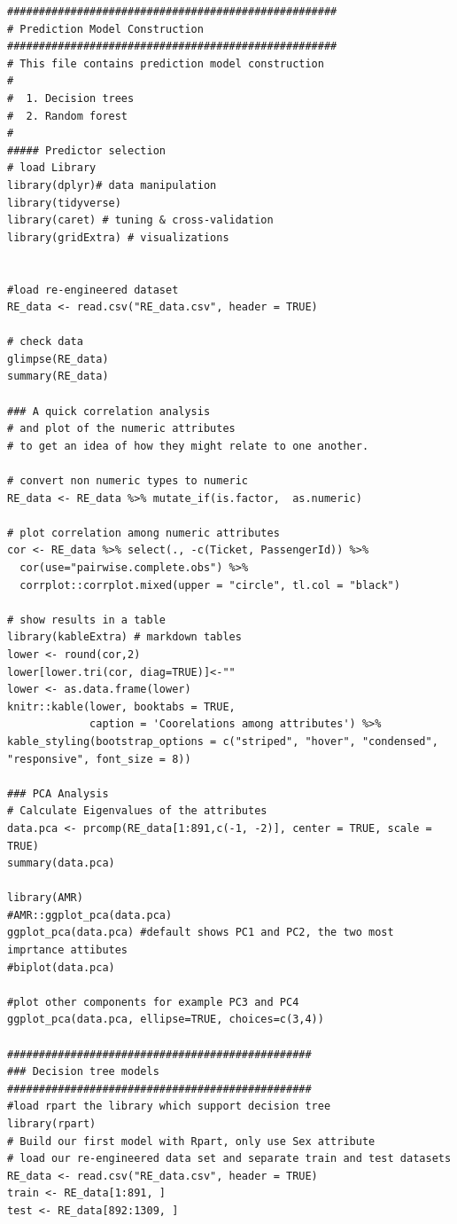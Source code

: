 \documentclass[
]{book}
\begin{document}
\begin{verbatim}
####################################################
# Prediction Model Construction
####################################################
# This file contains prediction model construction
#
#  1. Decision trees
#  2. Random forest
#
##### Predictor selection
# load Library
library(dplyr)# data manipulation
library(tidyverse)
library(caret) # tuning & cross-validation
library(gridExtra) # visualizations


#load re-engineered dataset
RE_data <- read.csv("RE_data.csv", header = TRUE)

# check data
glimpse(RE_data)
summary(RE_data)

### A quick correlation analysis
# and plot of the numeric attributes
# to get an idea of how they might relate to one another.

# convert non numeric types to numeric
RE_data <- RE_data %>% mutate_if(is.factor,  as.numeric)

# plot correlation among numeric attributes
cor <- RE_data %>% select(., -c(Ticket, PassengerId)) %>%
  cor(use="pairwise.complete.obs") %>%
  corrplot::corrplot.mixed(upper = "circle", tl.col = "black")

# show results in a table
library(kableExtra) # markdown tables
lower <- round(cor,2)
lower[lower.tri(cor, diag=TRUE)]<-""
lower <- as.data.frame(lower)
knitr::kable(lower, booktabs = TRUE,
             caption = 'Coorelations among attributes') %>%
kable_styling(bootstrap_options = c("striped", "hover", "condensed", "responsive", font_size = 8))

### PCA Analysis
# Calculate Eigenvalues of the attributes
data.pca <- prcomp(RE_data[1:891,c(-1, -2)], center = TRUE, scale = TRUE)
summary(data.pca)

library(AMR)
#AMR::ggplot_pca(data.pca)
ggplot_pca(data.pca) #default shows PC1 and PC2, the two most imprtance attibutes
#biplot(data.pca)

#plot other components for example PC3 and PC4
ggplot_pca(data.pca, ellipse=TRUE, choices=c(3,4))

################################################
### Decision tree models
################################################
#load rpart the library which support decision tree
library(rpart)
# Build our first model with Rpart, only use Sex attribute
# load our re-engineered data set and separate train and test datasets
RE_data <- read.csv("RE_data.csv", header = TRUE)
train <- RE_data[1:891, ]
test <- RE_data[892:1309, ]


\end{verbatim}
\end{document}

